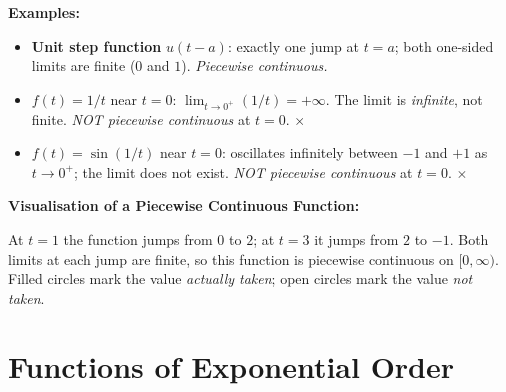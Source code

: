 \documentclass[12pt,a4paper]{article}
\begin{document}
\medskip
\noindent\textbf{Examples:}

\begin{itemize}
  \item \textbf{Unit step function} $u(t - a)$: exactly one jump at $t = a$; both one-sided
        limits are finite ($0$ and $1$). \emph{Piecewise continuous.} \checkmark
  \item $f(t) = 1/t$ near $t = 0$: $\lim_{t \to 0^+} (1/t) = +\infty$. The limit is
        \emph{infinite}, not finite. \emph{NOT piecewise continuous} at $t = 0$. $\times$
  \item $f(t) = \sin(1/t)$ near $t = 0$: oscillates infinitely between $-1$ and $+1$ as
        $t \to 0^+$; the limit does not exist. \emph{NOT piecewise continuous} at $t = 0$.
        $\times$
\end{itemize}

\medskip
\noindent\textbf{Visualisation of a Piecewise Continuous Function:}

\begin{center}
\end{center}

\noindent At $t=1$ the function jumps from $0$ to $2$; at $t=3$ it jumps from $2$ to $-1$.
Both limits at each jump are finite, so this function is piecewise continuous on $[0, \infty)$.
Filled circles mark the value \emph{actually taken}; open circles mark the value
\emph{not taken}.

\section{Functions of Exponential Order}
\end{document}
